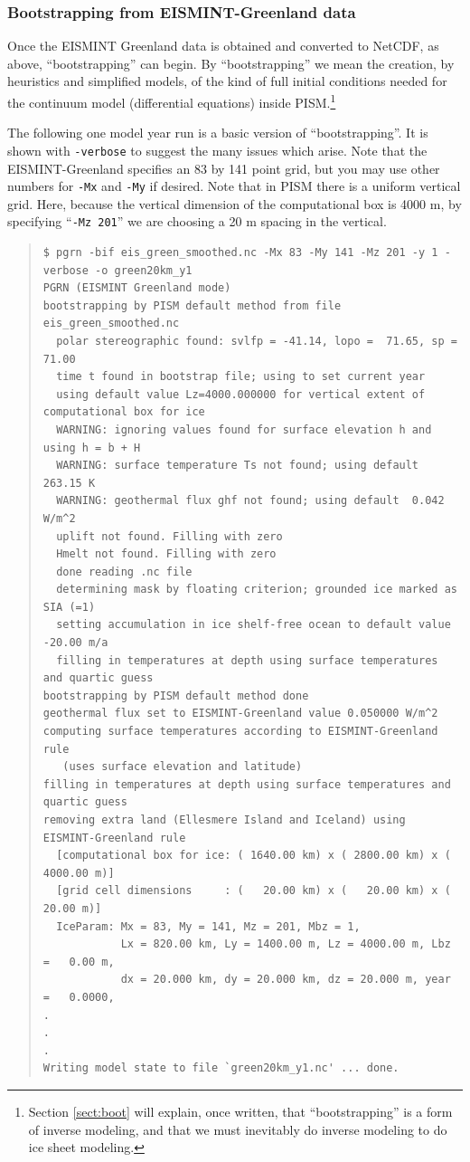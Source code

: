 \documentclass[11pt,final]{amsart}
\begin{document}
\subsubsection*{Bootstrapping from EISMINT-Greenland data}  Once the EISMINT Greenland data is obtained and converted to NetCDF, as above, ``bootstrapping'' can begin.  By ``bootstrapping'' we mean the creation, by heuristics and simplified models, of the kind of full initial conditions needed for the continuum model (differential equations) inside PISM.\footnote{Section \ref{sect:boot} will explain, once written, that ``bootstrapping'' is a form of inverse modeling, and that we must inevitably do inverse modeling to do ice sheet modeling.}

The following one model year run is a basic version of ``bootstrapping''.  It is shown with \verb|-verbose| to suggest the many issues which arise.  Note that the EISMINT-Greenland specifies an 83 by 141 point grid, but you may use other numbers for \verb|-Mx| and \verb|-My| if desired.  Note that in PISM there is a uniform vertical grid.  Here, because the vertical dimension of the computational box is 4000 m, by specifying ``\verb|-Mz 201|'' we are choosing a 20 m spacing in the vertical.

\small\begin{quote}\begin{verbatim}
$ pgrn -bif eis_green_smoothed.nc -Mx 83 -My 141 -Mz 201 -y 1 -verbose -o green20km_y1
PGRN (EISMINT Greenland mode)
bootstrapping by PISM default method from file eis_green_smoothed.nc
  polar stereographic found: svlfp = -41.14, lopo =  71.65, sp =  71.00
  time t found in bootstrap file; using to set current year
  using default value Lz=4000.000000 for vertical extent of computational box for ice
  WARNING: ignoring values found for surface elevation h and using h = b + H
  WARNING: surface temperature Ts not found; using default  263.15 K
  WARNING: geothermal flux ghf not found; using default  0.042 W/m^2
  uplift not found. Filling with zero
  Hmelt not found. Filling with zero
  done reading .nc file
  determining mask by floating criterion; grounded ice marked as SIA (=1)
  setting accumulation in ice shelf-free ocean to default value -20.00 m/a
  filling in temperatures at depth using surface temperatures and quartic guess
bootstrapping by PISM default method done
geothermal flux set to EISMINT-Greenland value 0.050000 W/m^2
computing surface temperatures according to EISMINT-Greenland rule 
   (uses surface elevation and latitude)
filling in temperatures at depth using surface temperatures and quartic guess
removing extra land (Ellesmere Island and Iceland) using EISMINT-Greenland rule
  [computational box for ice: ( 1640.00 km) x ( 2800.00 km) x ( 4000.00 m)]
  [grid cell dimensions     : (   20.00 km) x (   20.00 km) x (   20.00 m)]
  IceParam: Mx = 83, My = 141, Mz = 201, Mbz = 1,
            Lx = 820.00 km, Ly = 1400.00 m, Lz = 4000.00 m, Lbz =   0.00 m,
            dx = 20.000 km, dy = 20.000 km, dz = 20.000 m, year =   0.0000,
.
.
.
Writing model state to file `green20km_y1.nc' ... done.
\end{verbatim}
\end{quote}\normalsize
\end{document}
